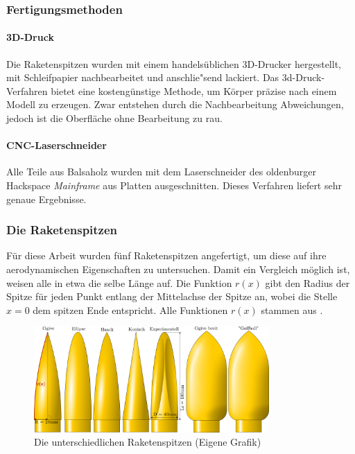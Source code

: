 \documentclass[10pt,a4paper]{article}
\begin{document}
\subsubsection{Fertigungsmethoden}
\label{sssec-Fertigungsmethoden}

\paragraph{3D-Druck}
Die Raketenspitzen wurden mit einem handelsüblichen 3D-Drucker hergestellt, mit Schleifpapier nachbearbeitet und anschlie"send lackiert. Das 3d-Druck-Verfahren bietet eine kostengünstige Methode, um Körper präzise nach einem Modell zu erzeugen. Zwar entstehen durch die Nachbearbeitung Abweichungen, jedoch ist die Oberfläche ohne Bearbeitung zu rau.

\paragraph{CNC-Laserschneider}
Alle Teile aus Balsaholz wurden mit dem Laserschneider des oldenburger Hackspace \emph{Mainframe} aus Platten ausgeschnitten. Dieses Verfahren liefert sehr genaue Ergebnisse.


\subsubsection{Die Raketenspitzen}
\label{sssec-Reketenspitzen}
Für diese Arbeit wurden fünf Raketenspitzen angefertigt, um diese auf ihre aerodynamischen Eigenschaften zu untersuchen. Damit ein Vergleich möglich ist, weisen alle in etwa die selbe Länge auf.
Die Funktion $r(x)$ gibt den Radius der Spitze für jeden Punkt entlang der Mittelachse der Spitze an, wobei die Stelle $x=0$ dem spitzen Ende entspricht. Alle Funktionen $r(x)$ stammen aus \cite{sn}.

\begin{figure}[h]
	\centering
	\includegraphics[width=0.8\textwidth]{Bilder/Raketenspitzen.png}
	\caption{Die unterschiedlichen Raketenspitzen (Eigene Grafik)}
	\label{fig-Raketenspitzen}
\end{figure}
\end{document}
